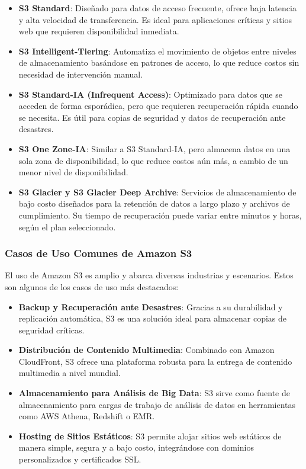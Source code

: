 {                \begin{itemize}
                    \item \textbf{S3 Standard}: Diseñado para datos de acceso frecuente, ofrece baja latencia y alta velocidad de transferencia. Es ideal para aplicaciones críticas y sitios web que requieren disponibilidad inmediata.
                    \item \textbf{S3 Intelligent-Tiering}: Automatiza el movimiento de objetos entre niveles de almacenamiento basándose en patrones de acceso, lo que reduce costos sin necesidad de intervención manual.
                    \item \textbf{S3 Standard-IA (Infrequent Access)}: Optimizado para datos que se acceden de forma esporádica, pero que requieren recuperación rápida cuando se necesita. Es útil para copias de seguridad y datos de recuperación ante desastres.
                    \item \textbf{S3 One Zone-IA}: Similar a S3 Standard-IA, pero almacena datos en una sola zona de disponibilidad, lo que reduce costos aún más, a cambio de un menor nivel de disponibilidad.
                    \item \textbf{S3 Glacier y S3 Glacier Deep Archive}: Servicios de almacenamiento de bajo costo diseñados para la retención de datos a largo plazo y archivos de cumplimiento. Su tiempo de recuperación puede variar entre minutos y horas, según el plan seleccionado.
                \end{itemize}
                
            \subsubsection{Casos de Uso Comunes de Amazon S3}
                El uso de Amazon S3 es amplio y abarca diversas industrias y escenarios. Estos son algunos de los casos de uso más destacados:
                
                \begin{itemize}
                    \item \textbf{Backup y Recuperación ante Desastres}: Gracias a su durabilidad y replicación automática, S3 es una solución ideal para almacenar copias de seguridad críticas.
                    \item \textbf{Distribución de Contenido Multimedia}: Combinado con Amazon CloudFront, S3 ofrece una plataforma robusta para la entrega de contenido multimedia a nivel mundial.
                    \item \textbf{Almacenamiento para Análisis de Big Data}: S3 sirve como fuente de almacenamiento para cargas de trabajo de análisis de datos en herramientas como AWS Athena, Redshift o EMR.
                    \item \textbf{Hosting de Sitios Estáticos}: S3 permite alojar sitios web estáticos de manera simple, segura y a bajo costo, integrándose con dominios personalizados y certificados SSL.
                \end{itemize}

}
